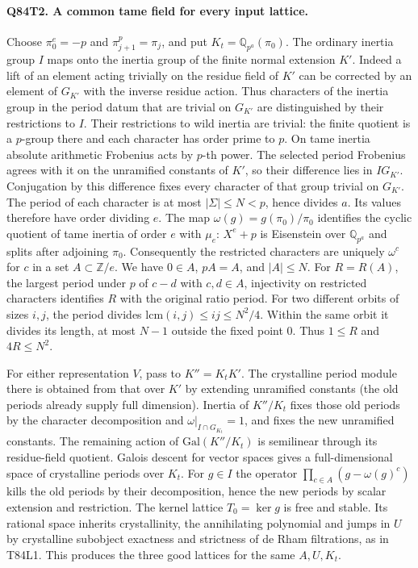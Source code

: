 \paragraph{Q84T2. A common tame field for every input lattice.}
Choose $\pi_0^e=-p$ and $\pi_{j+1}^p=\pi_j$, and put
$K_t=\mathbb Q_{p^a}(\pi_0)$. The ordinary inertia group $I$ maps
onto the inertia group of the finite normal extension $K'$.
Indeed a lift of an element acting trivially on the residue field
of $K'$ can be corrected by an element of $G_{K'}$ with the inverse
residue action. Thus characters of the inertia group in the period
datum that are trivial on $G_{K'}$ are distinguished by their
restrictions to $I$. Their restrictions to wild inertia are trivial:
the finite quotient is a $p$-group there and each character has
order prime to $p$. On tame inertia absolute arithmetic Frobenius
acts by $p$-th power. The selected period Frobenius agrees with it
on the unramified constants of $K'$, so their difference lies in
$I G_{K'}$. Conjugation by this difference fixes every character
of that group trivial on $G_{K'}$. The period of each character is at most
$|\Sigma|\le N<p$, hence divides $a$. Its values therefore have order
dividing $e$. The map $\omega(g)=g(\pi_0)/\pi_0$ identifies the
cyclic quotient of tame inertia of order $e$ with $\mu_e$:
$X^e+p$ is Eisenstein over $\mathbb Q_{p^a}$ and splits after adjoining
$\pi_0$. Consequently the restricted characters are uniquely
$\omega^c$ for $c$ in a set $A\subset\mathbb Z/e$. We have $0\in A$,
$pA=A$, and $|A|\le N$. For $R=R(A)$, the largest period under $p$
of $c-d$ with $c,d\in A$, injectivity on restricted characters
identifies $R$ with the original ratio period. For two different
orbits of sizes $i,j$, the period divides $\mathrm{lcm}(i,j)\le
ij\le N^2/4$. Within the same orbit it divides its length, at most
$N-1$ outside the fixed point $0$. Thus $1\le R$ and $4R\le N^2$.

For either representation $V$, pass to $K''=K_tK'$. The crystalline
period module there is obtained from that over $K'$ by extending
unramified constants (the old periods already supply full dimension).
Inertia of $K''/K_t$ fixes those old periods by the character
decomposition and $\omega|_{I\cap G_{K_t}}=1$, and fixes the new
unramified constants. The remaining action of
$\mathrm{Gal}(K''/K_t)$ is semilinear through its residue-field
quotient. Galois descent for vector spaces gives a full-dimensional
space of crystalline periods over $K_t$. For $g\in I$ the operator
$\prod_{c\in A}(g-\omega(g)^c)$ kills the old periods by their
decomposition, hence the new periods by scalar extension and restriction.
The kernel lattice $T_0=\ker g$ is free and stable. Its rational
space inherits crystallinity, the annihilating polynomial and jumps in
$U$ by crystalline subobject exactness and strictness of de Rham
filtrations, as in T84L1. This produces the three good lattices for
the same $A,U,K_t$.

